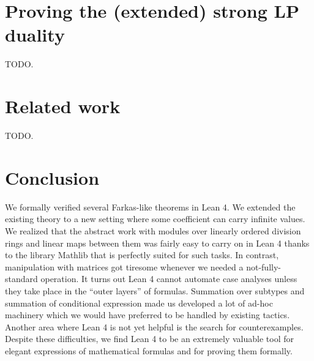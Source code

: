 \documentclass[]{article}
\renewcommand{\.}{\hskip .75pt}
\begin{document}
\section {Proving the (extended) strong LP duality}

TODO.


\section {Related work}

TODO.


\section {Conclusion}

We formally verified several Farkas-like theorems in Lean 4.
We extended the existing theory to a new setting where some
coefficient can carry infinite values. We realized that the
abstract work with modules over linearly ordered division rings
and linear maps between them was fairly easy to carry on in
Lean 4 thanks to the library Mathlib that is perfectly suited
for such tasks. In contrast, manipulation with matrices got
tiresome whenever we needed a not-fully-standard operation.
It turns out Lean 4 cannot automate case analyses unless they
take place in the ``outer layers'' of formulas. Summation
over subtypes and summation of conditional expression made
us developed a lot of ad-hoc machinery which we would have
preferred to be handled by existing tactics. Another area
where Lean 4 is not yet helpful is the search for counterexamples.
Despite these difficulties, we find Lean 4 to be an extremely
valuable tool for elegant expressions of mathematical formulas
and for proving them formally.
\end{document}
